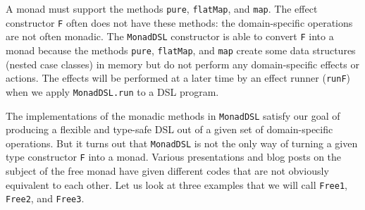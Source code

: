 A monad must support the methods \lstinline!pure!,
\lstinline!flatMap!, and
\lstinline!map!. The effect
constructor \lstinline!F!
often does not have these methods: the domain-specific operations
are not often monadic. The \lstinline!MonadDSL!
constructor is able to convert \lstinline!F!
into a monad because the methods \lstinline!pure!,
\lstinline!flatMap!, and
\lstinline!map! create
some data structures (nested case classes) in memory but do not perform
any domain-specific effects or actions. The effects will be performed
at a later time by an effect runner (\lstinline!runF!)
when we apply \lstinline!MonadDSL.run!
to a DSL program.

The implementations of the monadic methods in \lstinline!MonadDSL!
satisfy our goal of producing a flexible and type-safe DSL out of
a given set of domain-specific operations. But it turns out that \lstinline!MonadDSL!
is not the only way of turning a given type constructor \lstinline!F!
into a monad. Various presentations and blog posts on the subject
of the free monad have given different codes that are not obviously
equivalent to each other. Let us look at three examples that we will
call \lstinline!Free1!,
\lstinline!Free2!, and
\lstinline!Free3!. 

